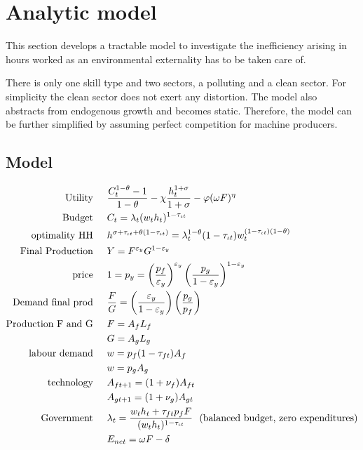 \section{Analytic model}
This section develops a tractable model to investigate the inefficiency arising in hours worked as an environmental externality has to be taken care of. 

There is only one skill type and two sectors, a polluting and a clean sector. For simplicity the clean sector does not exert any distortion. The model also abstracts from endogenous growth and becomes static. Therefore, the model can be further simplified by assuming perfect competition for machine producers.
\subsection{Model}
\begin{align}
\text{Utility}\hspace{5mm}& \frac{C_t^{1-\theta}-1}{1-\theta}-\chi \frac{h_t^{1+\sigma}}{1+\sigma}-\varphi(\omega F)^\eta\\
\text{Budget}\hspace{5mm}& C_t = \lambda_t(w_th_t)^{1-\tau_{\iota t}}\\
\text{optimality HH}\hspace{5mm}& h^{\sigma+\tau_{\iota t}+\theta(1-\tau_{\iota t})}=\lambda_t^{1-\theta}(1-\tau_{\iota t})w_t^{(1-\tau_{\iota t})(1-\theta)}\\
\text{Final Production}\hspace{5mm}&Y=F^{\varepsilon_y}G^{1-
\varepsilon_y}\\ %
\text{price}\hspace{5mm}&1=p_y= \left(\frac{p_f}{\varepsilon_y}\right)^{\varepsilon_y}\left(\frac{p_g}{1-\varepsilon_y}\right)^{1-\varepsilon_y}\\
\text{Demand final prod}\hspace{5mm}&\frac{F}{G}=\left(\frac{\varepsilon_y}{1-\varepsilon_y}\right)\left(\frac{p_g}{p_f}\right)\\
\text{Production F and G}\hspace{5mm}&F=A_fL_f\\\
& G=A_gL_g\\
\text{labour demand}\hspace{5mm}& w=p_f(1-\tau_{ft})A_f\\
& w=p_gA_g\\
\text{technology}\hspace{5mm}&A_{ft+1}=(1+\nu_f)A_{ft}\\
&A_{gt+1}=(1+\nu_g)A_{gt}\\
\text{Government}\hspace{5mm}&\lambda_t=\frac{w_t h_t+\tau_{ft}p_fF}{(w_t h_t)^{1-\tau_{\iota t}}}\ \ \text{(balanced budget, zero expenditures)}\\
&E_{net}=\omega F-\delta
\end{align}

